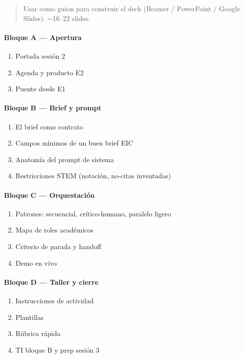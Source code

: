 \begin{quote}
Usar como guion para construir el deck (Beamer / PowerPoint / Google Slides). $\sim$16--22 slides.
\end{quote}

\paragraph{Bloque A --- Apertura}\begin{enumerate}
\item Portada sesión 2
\item Agenda y producto E2
\item Puente desde E1
\end{enumerate}
\paragraph{Bloque B --- Brief y prompt}\begin{enumerate}
\item El brief como contrato
\item Campos mínimos de un buen brief EIC
\item Anatomía del prompt de sistema
\item Restricciones STEM (notación, no-citas inventadas)
\end{enumerate}
\paragraph{Bloque C --- Orquestación}\begin{enumerate}
\item Patrones: secuencial, crítico-humano, paralelo ligero
\item Mapa de roles académicos
\item Criterio de parada y handoff
\item Demo en vivo
\end{enumerate}
\paragraph{Bloque D --- Taller y cierre}\begin{enumerate}
\item Instrucciones de actividad
\item Plantillas
\item Rúbrica rápida
\item TI bloque B y prep sesión 3
\end{enumerate}

